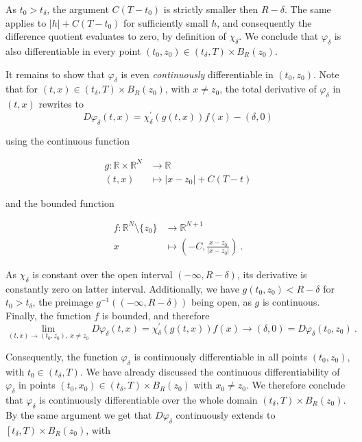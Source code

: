 As $ t_0 > t_{\delta} $, the argument $ C(T - t_0) $ is strictly smaller then $ R - \delta $. The same applies to $ \lvert h \rvert + C(T - t_0) $ for sufficiently small $ h $, and consequently the difference quotient evaluates to zero, by definition of $ \chi_{\delta} $. We conclude that $ \varphi_{\delta} $ is also differentiable in every point $ (t_0, z_0) \in \left(t_{\delta}, T \right) \times B_R (z_0) $.

It remains to show that $ \varphi_{\delta} $ is even \emph{continuously} differentiable in $ (t_0, z_0) $. Note that for $ (t, x)  \in \left(t_{\delta}, T\right) \times B_R (z_0) $, with $ x \neq z_0 $, the total derivative of $ \varphi_{\delta} $ in $ (t, x) $ rewrites to
\begin{equation*}
	D \varphi_{\delta} (t, x) = \chi_{\delta}^{\prime}(g(t, x))f(x) - \left(\delta, 0 \right)
\end{equation*}

using the continuous function

\begin{align*}
	g : \mathbb{R} \times \mathbb{R}^N &\to \mathbb{R} \\
	(t, x) &\mapsto \lvert x - z_0 \rvert + C(T - t)
\end{align*}

and the bounded function

\begin{align*}
	f : \mathbb{R}^N \setminus \{ z_0 \} &\to \mathbb{R}^{N + 1} \\
	x &\mapsto \left(-C, \frac{x - z_0}{\lvert x - z_0 \rvert}\right) \ .
\end{align*}

As $ \chi_{\delta} $ is constant over the open interval $ \left(- \infty, R - \delta \right) $, its derivative is constantly zero on latter interval. Additionally, we have $ g(t_0, z_0) < R - \delta $ for $ t_0 > t_{\delta} $, the preimage $ g^{-1}((-\infty, R - \delta)) $ being open, as $ g $ is continuous. Finally, the function $ f $ is bounded, and therefore
\begin{equation*}
	\lim\limits_{(t, x) \to (t_0, z_0), \ x \neq z_0} D \varphi_{\delta}(t, x) = \chi_{\delta}^{\prime}(g(t, x))f(x) \to \left(\delta, 0 \right) = D \varphi_{\delta}(t_0, z_0) \ .
\end{equation*}

Consequently, the function $ \varphi_{\delta} $ is continuously differentiable in all points $ (t_0, z_0) $, with $ t_0 \in \left(t_{\delta}, T \right) $. We have already discussed the continuous differentiability of $ \varphi_{\delta} $ in points $ (t_0, x_0) \in \left(t_{\delta}, T \right) \times B_R (z_0) $ with $ x_0 \neq z_0 $. We therefore conclude that $ \varphi_{\delta} $ is continuously differentiable over the whole domain $ \left(t_{\delta}, T \right) \times B_R (z_0) $. By the same argument we get that $ D \varphi_{\delta} $ continuously extends to $ \left[t_{\delta}, T \right) \times B_R (z_0) $, with

